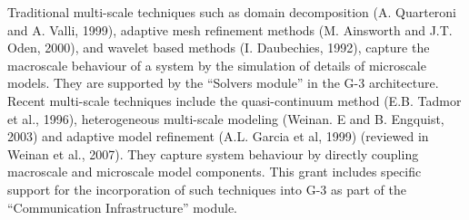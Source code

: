 \documentclass[12pt]{article}
\begin{document}

Traditional multi-scale techniques such as 
domain decomposition (A. Quarteroni and A. Valli, 1999),
adaptive mesh refinement methods (M. Ainsworth and J.T. Oden, 2000),
and wavelet based methods (I. Daubechies, 1992),
capture the macroscale behaviour of a system by the
simulation of details of microscale models.  They are supported by the
``Solvers module'' in the G-3 architecture.  Recent multi-scale
techniques include the quasi-continuum method (E.B. Tadmor et al., 1996),
heterogeneous multi-scale modeling (Weinan. E and B. Engquist, 2003)
and adaptive model refinement (A.L. Garcia et al, 1999)
(reviewed in Weinan et al., 2007).  They capture system behaviour by
directly coupling macroscale and microscale model components.  This
grant includes specific support for the incorporation of such
techniques into G-3 as part of the ``Communication Infrastructure''
module.
\end{document}
